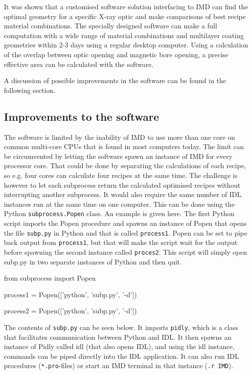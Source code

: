 It was shown that a customised software solution interfacing to IMD can find the optimal geometry for a specific X-ray optic and make comparisons of best recipe material combinations. The specially designed software can make a full computation with a wide range of material combinations and multilayer coating geometries within 2-3 days using a regular desktop computer. Using a calculation of the overlap between optic opening and magnetic bore opening, a precise effective area can be calculated with the software.

A discussion of possible improvements in the software can be found in the following section.

\subsection{Improvements to the software}\label{sec:software_improvements}
The software is limited by the inability of IMD to use more than one core on common multi-core CPUs that is found in most computers today. The limit can be circumvented by letting the software spawn an instance of IMD for every processor core. That could be done by separating the calculations of each recipe, so e.g. four cores can calculate four recipes at the same time. The challenge is however to let each subprocess return the calculated optimised recipes without interrupting another subprocess. It would also require the same number of IDL instances run at the same time on one computer. This can be done using the Python \verb|subprocess.Popen| class. An example is given here. The first Python script imports the Popen procedure and spawns an instance of Popen that opens the file \verb|subp.py| in Python and that is called \verb|process1|. Popen can be set to pipe back output from \verb|process1|, but that will make the script wait for the output before spawning the second instance called \verb|proces2|. This script will simply open subp.py in two separate instances of Python and then quit.

\begin{verbcode}
from subprocess import Popen

process1 = Popen(['python', 'subp.py', '-d'])

process2 = Popen(['python', 'subp.py', '-d'])
\end{verbcode}

The contents of \verb|subp.py| can be seen below. It imports \verb|pidly|, which is a class that facilitates communication between Python and IDL. It then spawns an instance of Pidly called idl (that also opens IDL), and using the idl instance, commands can be piped directly into the IDL application. It can also run IDL procedures (\verb|*.pro|-files) or start an IMD terminal in that instance (\verb|.r IMD|).

